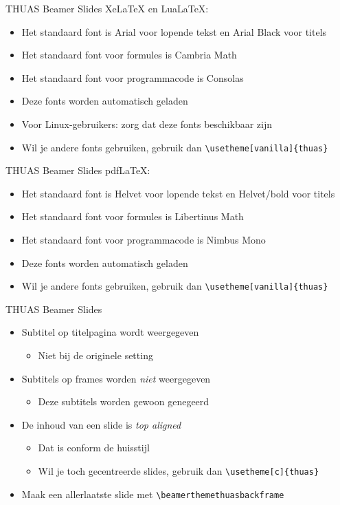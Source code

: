 \documentclass[fleqn,aspectratio=169,dutch,10pt]{beamer}
\begin{document}
\begin{frame}[fragile]{THUAS Beamer Slides}
Xe\LaTeX{} en Lua\LaTeX:
\begin{itemize}
\item Het standaard font is Arial voor lopende tekst en Arial Black voor titels
\item Het standaard font voor formules is Cambria Math
\item Het standaard font voor programmacode is Consolas
\item Deze fonts worden automatisch geladen
\item Voor Linux-gebruikers: zorg dat deze fonts beschikbaar zijn
\item Wil je andere fonts gebruiken, gebruik dan \lstinline|\usetheme[vanilla]{thuas}|
\end{itemize}
\end{frame}


\begin{frame}[fragile]{THUAS Beamer Slides}
pdf\LaTeX{}:
\begin{itemize}
\item Het standaard font is Helvet voor lopende tekst en Helvet/bold voor titels
\item Het standaard font voor formules is Libertinus Math
\item Het standaard font voor programmacode is Nimbus Mono
\item Deze fonts worden automatisch geladen
\item Wil je andere fonts gebruiken, gebruik dan \lstinline|\usetheme[vanilla]{thuas}|
\end{itemize}
\end{frame}


\begin{frame}[fragile]{THUAS Beamer Slides}
\begin{itemize}
\item Subtitel op titelpagina wordt weergegeven
\begin{itemize}
\item Niet bij de originele setting
\end{itemize}
\item Subtitels op frames worden \emph{niet} weergegeven
\begin{itemize}
\item Deze subtitels worden gewoon genegeerd
\end{itemize}
\item De inhoud van een slide is \emph{top aligned}
\begin{itemize}
\item Dat is conform de huisstijl
\item Wil je toch gecentreerde slides, gebruik dan \lstinline|\usetheme[c]{thuas}|
\end{itemize}
\item Maak een allerlaatste slide met \lstinline|\beamerthemethuasbackframe|
\end{itemize}
\end{frame}
\end{document}
